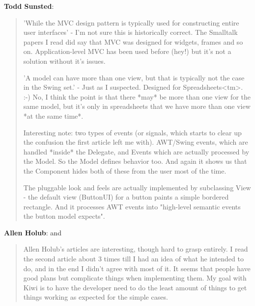 \documentclass[a4paper]{howto}
\begin{document}
{\bf Todd Sunsted}:

\begin{quotation}

    'While the MVC design pattern is typically used for constructing
    entire user interfaces' - I'm not sure this is historically correct.
    The Smalltalk papers I read did say that MVC was designed for
    widgets, frames and so on. Application-level MVC has been used
    before (hey!) but it's not a solution without it's issues.

    'A model can have more than one view, but that is typically not the
    case in the Swing set.' - Just as I suspected. Designed for
    Spreadsheets<tm>. :-) No, I think the point is that there *may* be
    more than one view for the same model, but it's only in spreadsheets
    that we have more than one view *at the same time*.

    Interesting note: two types of events (or signals, which starts to
    clear up the confusion the first article left me with). AWT/Swing
    events, which are handled *inside* the Delegate, and Events which
    are actually processed by the Model. So the Model defines behavior
    too. And again it shows us that the Component hides both of these
    from the user most of the time.

    The pluggable look and feels are actually implemented by subclassing
    View - the default view (ButtonUI) for a button paints a simple
    bordered rectangle. And it processes AWT events into "high-level
    semantic events the button model expects".

\end{quotation}

{\bf Allen Holub}:
and

\begin{quotation}

    Allen Holub's articles are interesting, though hard to grasp
    entirely. I read the second article about 3 times till I had an idea
    of what he intended to do, and in the end I didn't agree with most
    of it. It seems that people have good plans but complicate things
    when implementing them. My goal with Kiwi is to have the developer
    need to do the least amount of things to get things working as
    expected for the simple cases.

\end{quotation}
\end{document}
